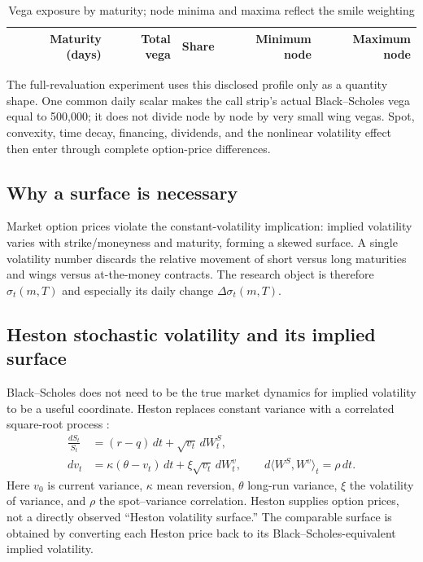 \documentclass[11pt,a4paper]{article}
\begin{document}
\begin{table}[H]
\centering
\caption{Vega exposure by maturity; node minima and maxima reflect the smile weighting}
\label{tab:vega}
\begin{tabular}{rrrrr}
\toprule
Maturity (days) & Total vega & Share & Minimum node & Maximum node \\
\midrule

\end{tabular}
\end{table}

The full-revaluation experiment uses this disclosed profile only as a quantity shape. One common
daily scalar makes the call strip's actual Black--Scholes vega equal to 500,000; it does not divide
node by node by very small wing vegas. Spot, convexity, time decay, financing, dividends, and the
nonlinear volatility effect then enter through complete option-price differences.

\subsection{Why a surface is necessary}

Market option prices violate the constant-volatility implication: implied volatility varies with
strike/moneyness and maturity, forming a skewed surface. A single volatility number discards the
relative movement of short versus long maturities and wings versus at-the-money contracts. The
research object is therefore $\sigma_t(m,T)$ and especially its daily change
$\Delta\sigma_t(m,T)$.

\subsection{Heston stochastic volatility and its implied surface}

Black--Scholes does not need to be the true market dynamics for implied volatility to be a useful
coordinate. Heston replaces constant variance with a correlated square-root process
\cite{heston1993}:
\begin{align}
\frac{dS_t}{S_t}&=(r-q)\,dt+\sqrt{v_t}\,dW_t^S,\\
dv_t&=\kappa(\theta-v_t)\,dt+\xi\sqrt{v_t}\,dW_t^v,
\qquad d\langle W^S,W^v\rangle_t=\rho\,dt.
\end{align}
Here $v_0$ is current variance, $\kappa$ mean reversion, $\theta$ long-run variance, $\xi$ the
volatility of variance, and $\rho$ the spot--variance correlation. Heston supplies option prices,
not a directly observed ``Heston volatility surface.'' The comparable surface is obtained by
converting each Heston price back to its Black--Scholes-equivalent implied volatility.
\end{document}
